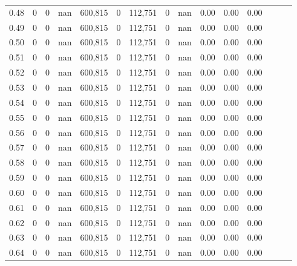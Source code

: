 \begin{tabular}{rrrrrrrrrrrrrrr}
0.48 &        0 &       0 &   nan &  600,815 &        0 &  112,751 &        0 &   nan &  0.00 &  0.00 &      0.00 \\
0.49 &        0 &       0 &   nan &  600,815 &        0 &  112,751 &        0 &   nan &  0.00 &  0.00 &      0.00 \\
0.50 &        0 &       0 &   nan &  600,815 &        0 &  112,751 &        0 &   nan &  0.00 &  0.00 &      0.00 \\
0.51 &        0 &       0 &   nan &  600,815 &        0 &  112,751 &        0 &   nan &  0.00 &  0.00 &      0.00 \\
0.52 &        0 &       0 &   nan &  600,815 &        0 &  112,751 &        0 &   nan &  0.00 &  0.00 &      0.00 \\
0.53 &        0 &       0 &   nan &  600,815 &        0 &  112,751 &        0 &   nan &  0.00 &  0.00 &      0.00 \\
0.54 &        0 &       0 &   nan &  600,815 &        0 &  112,751 &        0 &   nan &  0.00 &  0.00 &      0.00 \\
0.55 &        0 &       0 &   nan &  600,815 &        0 &  112,751 &        0 &   nan &  0.00 &  0.00 &      0.00 \\
0.56 &        0 &       0 &   nan &  600,815 &        0 &  112,751 &        0 &   nan &  0.00 &  0.00 &      0.00 \\
0.57 &        0 &       0 &   nan &  600,815 &        0 &  112,751 &        0 &   nan &  0.00 &  0.00 &      0.00 \\
0.58 &        0 &       0 &   nan &  600,815 &        0 &  112,751 &        0 &   nan &  0.00 &  0.00 &      0.00 \\
0.59 &        0 &       0 &   nan &  600,815 &        0 &  112,751 &        0 &   nan &  0.00 &  0.00 &      0.00 \\
0.60 &        0 &       0 &   nan &  600,815 &        0 &  112,751 &        0 &   nan &  0.00 &  0.00 &      0.00 \\
0.61 &        0 &       0 &   nan &  600,815 &        0 &  112,751 &        0 &   nan &  0.00 &  0.00 &      0.00 \\
0.62 &        0 &       0 &   nan &  600,815 &        0 &  112,751 &        0 &   nan &  0.00 &  0.00 &      0.00 \\
0.63 &        0 &       0 &   nan &  600,815 &        0 &  112,751 &        0 &   nan &  0.00 &  0.00 &      0.00 \\
0.64 &        0 &       0 &   nan &  600,815 &        0 &  112,751 &        0 &   nan &  0.00 &  0.00 &      0.00 \\

\end{tabular}
